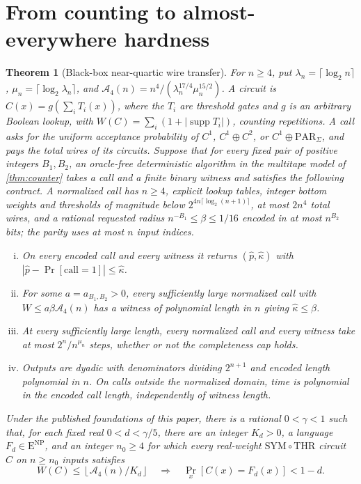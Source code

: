 \documentclass[11pt,letterpaper]{article}
\newtheorem{theorem}{Theorem}[section]
\theoremstyle{definition}
\theoremstyle{remark}
\newcommand{\THR}{\mathrm{THR}}
\newcommand{\SYM}{\mathrm{SYM}}
\newcommand{\ENP}{\mathrm{E}^{\mathrm{NP}}}
\newcommand{\PAR}{\mathrm{PAR}}
\newcommand{\phat}{\widehat p}
\newcommand{\khat}{\widehat\kappa}
\providecommand{\supp}{\operatorname{supp}}
\begin{document}
\section{From counting to almost-everywhere hardness}\label{sec:transfer}

\begin{theorem}[Black-box near-quartic wire transfer]\label{thm:wire-transfer}
For \(n\ge4\), put \(\lambda_n=\lceil\log_2n\rceil\), \(\mu_n=\lceil\log_2\lambda_n\rceil\), and \(\mathcal A_4(n)=n^4/(\lambda_n^{17/4}\mu_n^{15/2})\).
A circuit is \(C(x)=g(\sum_iT_i(x))\), where the \(T_i\) are threshold gates and \(g\) is an arbitrary Boolean lookup, with \(W(C)=\sum_i(1+|\supp T_i|)\), counting repetitions.
A call asks for the uniform acceptance probability of \(C^1\), \(C^1\oplus C^2\), or \(C^1\oplus\PAR_\Sigma\), and pays the total wires of its circuits.
Suppose that for every fixed pair of positive integers \(B_1,B_2\), an oracle-free deterministic algorithm in the multitape model of \cref{thm:counter} takes a call and a finite binary witness and satisfies the following contract.
A normalized call has \(n\ge4\), explicit lookup tables, integer bottom weights and thresholds of magnitude below \(2^{4n\lceil\log_2(n+1)\rceil}\), at most \(2n^4\) total wires, and a rational requested radius \(n^{-B_1}\le\beta\le1/16\) encoded in at most \(n^{B_2}\) bits; the parity uses at most \(n\) input indices.
\begin{enumerate}[(i)]
\item On every encoded call and every witness it returns \((\phat,\khat)\) with \(|\phat-\Pr[\mathrm{call}=1]|\le\khat\).
\item For some \(a=a_{B_1,B_2}>0\), every sufficiently large normalized call with \(W\le a\beta\mathcal A_4(n)\) has a witness of polynomial length in \(n\) giving \(\khat\le\beta\).
\item At every sufficiently large length, every normalized call and every witness take at most \(2^n/n^{\mu_n}\) steps, whether or not the completeness cap holds.
\item Outputs are dyadic with denominators dividing \(2^{n+1}\) and encoded length polynomial in \(n\). On calls outside the normalized domain, time is polynomial in the encoded call length, independently of witness length.
\end{enumerate}
Under the published foundations of this paper, there is a rational \(0<\gamma<1\) such that, for each fixed real \(0<d<\gamma/5\), there are an integer \(K_d>0\), a language \(F_d\in\ENP\), and an integer \(n_0\ge4\) for which every real-weight \(\SYM\circ\THR\) circuit \(C\) on \(n\ge n_0\) inputs satisfies
\[
 W(C)\le\left\lfloor\mathcal A_4(n)/K_d\right\rfloor
 \quad\Longrightarrow\quad \Pr_x[C(x)=F_d(x)]<1-d.
\]
\end{theorem}
\end{document}
